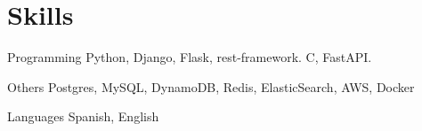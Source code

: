 
\section{Skills}

  \cvitem
    {Programming}
    {Python, Django, Flask, rest-framework. C, FastAPI.}

  \cvitem
    {Others}
    {Postgres, MySQL, DynamoDB, Redis, ElasticSearch, AWS, Docker}

  \cvitem
    {Languages}
    {Spanish, English}

